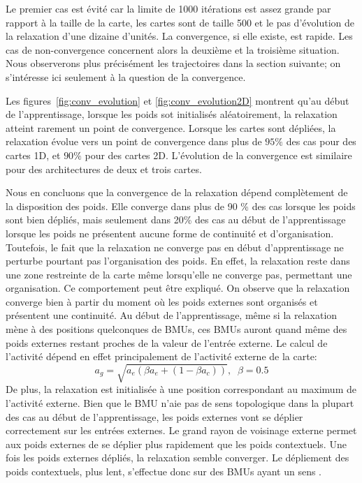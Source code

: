\documentclass[../main]{subfiles}
\begin{document}
Le premier cas est évité car la limite de 1000 itérations est assez grande par rapport à la taille de la carte, les cartes sont de taille 500 et le pas d'évolution de la relaxation d'une dizaine d'unités. 
La convergence, si elle existe, est rapide. Les cas de non-convergence concernent alors la deuxième et la troisième situation. Nous observerons plus précisément les trajectoires dans la section suivante; on s'intéresse ici seulement à la question de la convergence.

Les figures~\ref{fig:conv_evolution} et \ref{fig:conv_evolution2D} montrent qu'au début de l'apprentissage, lorsque les poids sot initialisés aléatoirement, la relaxation atteint rarement un point de convergence. Lorsque les cartes sont dépliées, la relaxation évolue vers un point de convergence dans plus de $95\%$ des cas pour des cartes 1D, et $90\%$ pour des cartes 2D. L'évolution de la convergence est similaire pour des architectures de deux et trois cartes.

Nous en  concluons que la convergence de la relaxation dépend complètement de la disposition des poids. 
Elle converge dans plus de 90 \% des cas lorsque les poids sont bien dépliés, mais seulement dans 20\% des cas au début de l'apprentissage lorsque les poids ne présentent aucune forme de continuité et d'organisation.
Toutefois, le fait que la relaxation ne converge pas en début d'apprentissage ne perturbe pourtant pas l'organisation des poids. En effet, la relaxation reste dans une zone restreinte de la carte même lorsqu'elle ne converge pas, permettant une organisation.
Ce comportement peut être expliqué. On observe que la relaxation converge bien à partir du moment où les poids externes sont organisés et présentent une continuité. 
Au début de l'apprentissage, même si la relaxation mène à des positions quelconques de BMUs, ces BMUs auront quand même des poids externes restant proches de la valeur de l'entrée externe. 
Le calcul de l'activité dépend en effet principalement de l'activité externe de la carte:
$$ a_g = \sqrt{a_e ( \beta a_e + (1-\beta a_c))}, \;\; \beta=0.5$$ 
De plus, la relaxation est initialisée à une position correspondant au maximum de l'activité externe.
Bien que le BMU n'aie pas de sens topologique dans la plupart des cas au début de l'apprentissage, les poids externes vont se déplier correctement sur les entrées externes. Le grand rayon de voisinage externe permet aux poids externes de se déplier plus rapidement que les poids contextuels. 
Une fois les poids externes dépliés, la relaxation semble converger. Le dépliement des poids contextuels, plus lent, s'effectue donc sur des BMUs ayant un \og sens \fg{}.
\end{document}
